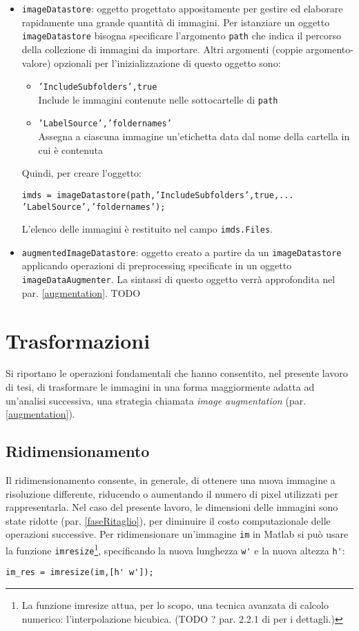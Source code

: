 \begin{itemize}

\item \verb|imageDatastore|: oggetto progettato appositamente per gestire ed elaborare rapidamente una grande quantità di immagini. Per istanziare un oggetto \verb|imageDatastore| bisogna specificare l'argomento \verb|path| che indica il percorso della collezione di immagini da importare. Altri argomenti (coppie argomento-valore) opzionali per l'inizializzazione di questo oggetto sono:
\begin{itemize}
\item \verb|’IncludeSubfolders’,true|\\
Include le immagini contenute nelle sottocartelle di \verb|path| 
\item \verb|’LabelSource’,’foldernames’|\\
Assegna a ciascuna immagine un’etichetta
data dal nome della cartella in cui è contenuta
\end{itemize}
Quindi, per creare l'oggetto:
\begin{verbatim}
imds = imageDatastore(path,’IncludeSubfolders’,true,...
’LabelSource’,’foldernames’);
\end{verbatim}
L’elenco delle immagini è restituito nel campo \verb|imds.Files|.

\item \verb|augmentedImageDatastore|: oggetto creato a partire da un \verb|imageDatastore| applicando operazioni di preprocessing specificate in un oggetto \verb|imageDataAugmenter|. La sintassi di questo oggetto verrà approfondita nel par. \ref{augmentation}. TODO

\end{itemize}

\section{Trasformazioni}
Si riportano le operazioni fondamentali che hanno consentito, nel presente lavoro di tesi, di trasformare le immagini in una forma maggiormente adatta ad un’analisi successiva, una strategia chiamata \textit{image augmentation} (par. \ref{augmentation}).

\subsection{Ridimensionamento}
Il ridimensionamento consente, in generale, di ottenere una nuova immagine a risoluzione differente, riducendo o aumentando il numero di pixel utilizzati per rappresentarla.
Nel caso del presente lavoro, le dimensioni delle immagini sono state ridotte (par. \ref{faseRitaglio}), per diminuire il costo computazionale delle operazioni successive.
Per ridimensionare un'immagine \verb|im| in Matlab si può usare la funzione \verb|imresize|\footnote{La funzione imresize attua, per lo scopo, una tecnica avanzata di calcolo numerico: l’interpolazione bicubica. (TODO ? par. 2.2.1 di \cite{gianvito} per i dettagli.)}, specificando la nuova lunghezza \verb|w'| e la nuova altezza \verb|h'|:
\begin{verbatim}
im_res = imresize(im,[h' w']);
\end{verbatim}

